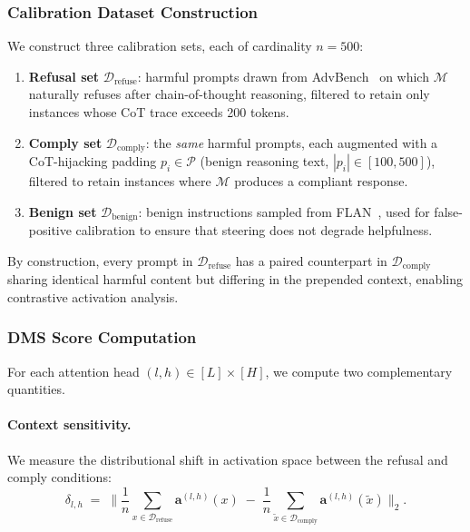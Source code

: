 \documentclass[11pt]{article}
\begin{document}
\subsubsection{Calibration Dataset Construction}
\label{subsubsec:data}

We construct three calibration sets, each of cardinality $n{=}500$:

\begin{enumerate}[leftmargin=*,itemsep=2pt]
\item \textbf{Refusal set} $\mathcal{D}_{\mathrm{refuse}}$: harmful prompts drawn from AdvBench~\citep{zou2023universal} on which $\mathcal{M}$ naturally refuses after chain-of-thought reasoning, filtered to retain only instances whose CoT trace exceeds 200 tokens.
\item \textbf{Comply set} $\mathcal{D}_{\mathrm{comply}}$: the \emph{same} harmful prompts, each augmented with a CoT-hijacking padding $p_i\in\mathcal{P}$ (benign reasoning text, $|p_i|\in[100,500]$), filtered to retain instances where $\mathcal{M}$ produces a compliant response.
\item \textbf{Benign set} $\mathcal{D}_{\mathrm{benign}}$: benign instructions sampled from FLAN~\citep{wei2022flan}, used for false-positive calibration to ensure that steering does not degrade helpfulness.
\end{enumerate}

\noindent By construction, every prompt in $\mathcal{D}_{\mathrm{refuse}}$ has a paired counterpart in $\mathcal{D}_{\mathrm{comply}}$ sharing identical harmful content but differing in the prepended context, enabling contrastive activation analysis.

\subsubsection{DMS Score Computation}
\label{subsubsec:dms_score}

For each attention head $(l,h)\in[L]\times[H]$, we compute two complementary quantities.

\paragraph{Context sensitivity.} We measure the distributional shift in activation space between the refusal and comply conditions:
\begin{equation}
\label{eq:context_sens}
\delta_{l,h} \;=\; \bigg\|\frac{1}{n}\sum_{x\in\mathcal{D}_{\mathrm{refuse}}}\!\mathbf{a}^{(l,h)}(x) \;-\; \frac{1}{n}\sum_{\tilde{x}\in\mathcal{D}_{\mathrm{comply}}}\!\mathbf{a}^{(l,h)}(\tilde{x})\bigg\|_2.
\end{equation}
\end{document}
